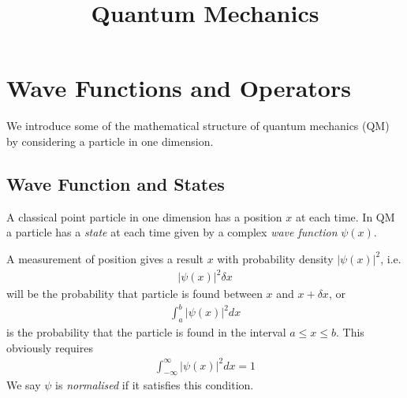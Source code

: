 \documentclass[a4paper]{article}
\begin{document}
\title{Quantum Mechanics}

\maketitle

\newpage

\tableofcontents

\newpage

\section{Wave Functions and Operators}
We introduce some of the mathematical structure of quantum mechanics (QM) by considering a particle in one dimension.

\subsection{Wave Function and States}
A classical point particle in one dimension has a position $x$ at each time. In QM a particle has a \emph{state} at each time given by a complex \emph{wave function} $\psi\left(x\right)$.

\begin{post}
A measurement of position gives a result $x$ with probability density $|\psi\left(x\right)|^2$, i.e.
\begin{equation*}
\begin{aligned}
|\psi\left(x\right)|^2 \delta x
\end{aligned}
\end{equation*}
will be the probability that particle is found between $x$ and $x+\delta x$, or
\begin{equation*}
\begin{aligned}
\int_a^b |\psi\left(x\right)|^2 dx
\end{aligned}
\end{equation*}
is the probability that the particle is found in the interval $a\leq x \leq b$.
This obviously requires
\begin{equation*}
\begin{aligned}
\int_{-\infty}^\infty |\psi\left(x\right)|^2 dx = 1
\end{aligned}
\end{equation*}
We say $\psi$ is \emph{normalised} if it satisfies this condition.
\end{post}
\end{document}
